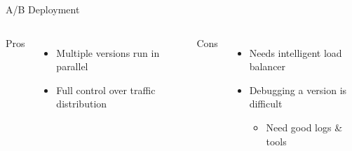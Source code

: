 \documentclass{slide}
\begin{document}
\begin{frame}{A/B Deployment}
    \vspace{1pt}
    \begin{columns}[t]
      \huge Pros
      {\LARGE
        \begin{itemize}
            \item { Multiple versions run in parallel\\}
            \vspace{1mm}
            \item { Full control over traffic distribution\\}
        \end{itemize}
      }
      \huge Cons
      {\LARGE
        \begin{itemize}
            \item { Needs intelligent load balancer\\}
            \vspace{1mm}
            \item { Debugging a version is difficult\\}
            \begin{itemize}
                \Large\item Need good logs \& tools
            \end{itemize}
        \end{itemize}
      }
    \end{columns}
\end{frame}
\end{document}
